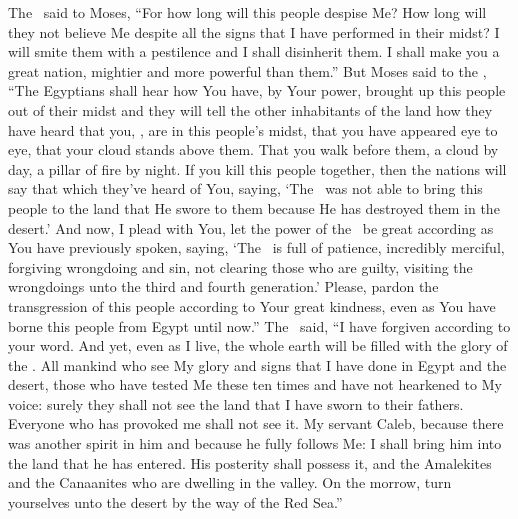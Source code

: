 \begin{inparaenum}
   The \lord\ said to Moses, ``For how long will this people despise Me? How long will they not believe Me despite all the signs that I have performed in their midst?%
   I will smite them with a pestilence and I shall disinherit them. I shall make you a great nation, mightier and more powerful than them.''%
   But Moses said to the \lord, ``The Egyptians shall hear how You have, by Your power, brought up this people out of their midst%
   and they will tell the other inhabitants of the land how they have heard that you, \lord, are in this people's midst, that you have appeared eye to eye, that your cloud stands above them. That you walk before them, a cloud by day, a pillar of fire by night.%
   If you kill this people together, then the nations will say that which they've heard of You, saying,%
   `The \lord\ was not able to bring this people to the land that He swore to them because He has destroyed them in the desert.'%
   And now, I plead with You, let the power of the \lord\ be great according as You have previously spoken, saying,%
   `The \lord\ is full of patience, incredibly merciful, forgiving wrongdoing and sin, not clearing those who are guilty, visiting the wrongdoings unto the third and fourth generation.'%
   Please, pardon the transgression of this people according to Your great kindness, even as You have borne this people from Egypt until now.''%
   The \lord\ said, ``I have forgiven according to your word.%
   And yet, even as I live, the whole earth will be filled with the glory of the \lord.%
   All mankind who see My glory and signs that I have done in Egypt and the desert, those who have tested Me these ten times and have not hearkened to My voice:%
   surely they shall not see the land that I have sworn to their fathers. Everyone who has provoked me shall not see it.%
   My servant Caleb, because there was another spirit in him and because he fully follows Me: I shall bring him into the land that he has entered. His posterity shall possess it,%
   and the Amalekites and the Canaanites who are dwelling in the valley. On the morrow, turn yourselves unto the desert by the way of the Red Sea.''%
  

\end{inparaenum}
